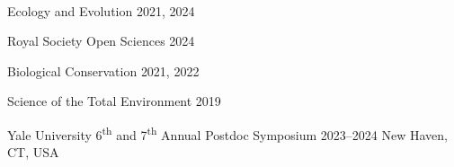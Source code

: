 \\





\begin{cvhonors}
  \mycvhonor
    {Ecology and Evolution} %
    {} %
    {2021, 2024} %

  \mycvhonor
    {Royal Society Open Sciences} %
    {} %
    {2024} %

  \mycvhonor
    {Biological Conservation} %
    {} %
    {2021, 2022} %

  \mycvhonor
    {Science of the Total Environment} %
    {} %
    {2019} %
\end{cvhonors}


\begin{cventries}
  \cventry
    {Yale University} %
    {6\textsuperscript{th} and 7\textsuperscript{th} Annual Postdoc Symposium} %
    {2023--2024} %
    {New Haven, CT, USA} %
    {}
\end{cventries}


